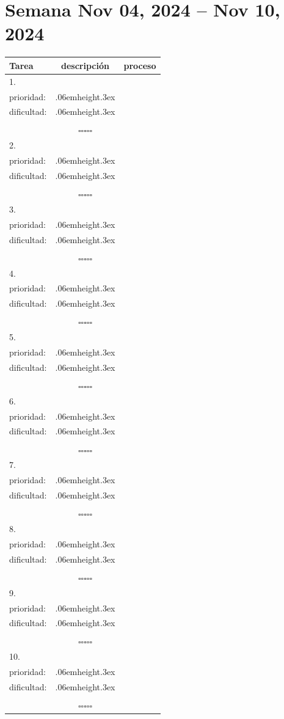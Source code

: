 \documentclass[a4paper,12pt, tikz]{scrartcl}
\newcommand\Vtextvisiblespace[1][.3em]{%
  \mbox{\kern.06em\vrule height.3ex}%
  \vbox{\hrule width#1}%
  \hbox{\vrule height.3ex}}
\newcommand{\subtablaDescrip}{ \begin{tabular}{ll}&\\ prioridad: & \Vtextvisiblespace[2em] \\ dificultad: & \Vtextvisiblespace[2em]\\&\\ \end{tabular}}
\begin{document}
\section*{Semana Nov 04, 2024 -- Nov 10, 2024}
\thispagestyle{empty}
\noindent
\begin{tabularx}{\linewidth}{|X|c c|}
    \hline
  \textbf{Tarea} & \textbf{descripción} & \textbf{proceso}\\
  \hline
   1.\vspace{4ex} &      \subtablaDescrip     & $\square\square\square\square\square$ \\
  \hline
  2.\vspace{4ex} &      \subtablaDescrip     & $\square\square\square\square\square$ \\
  \hline
  3.\vspace{4ex} &      \subtablaDescrip     & $\square\square\square\square\square$ \\
  \hline
  4.\vspace{4ex} &      \subtablaDescrip     & $\square\square\square\square\square$ \\
  \hline
  5.\vspace{4ex} &      \subtablaDescrip     & $\square\square\square\square\square$ \\
  \hline
  6.\vspace{4ex} &      \subtablaDescrip     & $\square\square\square\square\square$ \\
  \hline
  7.\vspace{4ex} &      \subtablaDescrip     & $\square\square\square\square\square$ \\
  \hline
  8.\vspace{4ex} &      \subtablaDescrip     & $\square\square\square\square\square$ \\
  \hline
  9.\vspace{4ex} &      \subtablaDescrip     & $\square\square\square\square\square$ \\
  \hline
  10.\vspace{4ex} &      \subtablaDescrip     & $\square\square\square\square\square$ \\
  \hline
\end{tabularx}

\newpage
\end{document}
